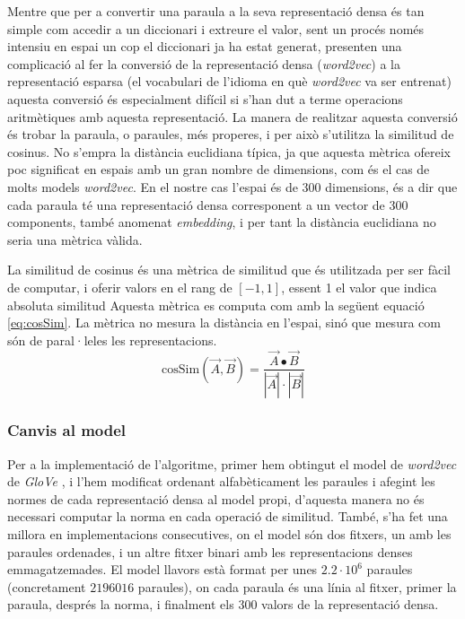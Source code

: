 \documentclass[catalan,10pt,a4paper]{article}
\begin{document}
Mentre que per a convertir una paraula a la seva representació densa és tan simple com accedir a un diccionari i extreure el valor, sent un procés només intensiu en espai un cop el diccionari ja ha estat generat, presenten una complicació al fer la conversió de la representació densa (\textit{word2vec}) a la representació esparsa (el vocabulari de l'idioma en què \textit{word2vec} va ser entrenat) aquesta conversió és especialment difícil si s'han dut a terme operacions aritmètiques amb aquesta representació.\newline
La manera de realitzar aquesta conversió és trobar la paraula, o paraules, més properes, i per això s'utilitza la similitud de cosinus. No s'empra la distància euclidiana típica, ja que aquesta mètrica ofereix poc significat en espais amb un gran nombre de dimensions, com és el cas de molts models \textit{word2vec}. En el nostre cas l'espai és de 300 dimensions, és a dir que cada paraula té una representació densa corresponent a un vector de 300 components, també anomenat \textit{embedding}, i per tant la distància euclidiana no seria una mètrica vàlida.

La similitud de cosinus \cite{Cosinesi72:online} és una mètrica de similitud que és utilitzada per ser fàcil de computar, i oferir valors en el rang de $[-1,1]$, essent 1 el valor que indica absoluta similitud Aquesta mètrica es computa com amb la següent equació \ref{eq:cosSim}. La mètrica no mesura la distància en l'espai, sinó que mesura com són de paral·leles les representacions.
\begin{equation} \label{eq:cosSim}
	\text{cosSim}(\vec A,\vec B) = \frac{\vec A\bullet \vec B}{|\vec A|\cdot|\vec B|}
\end{equation}

\subsubsection*{Canvis al model}
Per a la implementació de l'algoritme, primer hem obtingut el model de \textit{word2vec} de \textit{GloVe} \cite{GloVeGlo18:online}, i l'hem modificat ordenant alfabèticament les paraules i afegint les normes de cada representació densa al model propi, d'aquesta manera no és necessari computar la norma en cada operació de similitud. També, s'ha fet una millora en implementacions consecutives, on el model són dos fitxers, un amb les paraules ordenades, i un altre fitxer binari amb les representacions denses emmagatzemades. El model llavors està format per unes $2.2\cdot 10^{6}$ paraules (concretament $2196016$ paraules), on cada paraula és una línia al fitxer, primer la paraula, després la norma, i finalment els 300 valors de la representació densa.	
\end{document}
